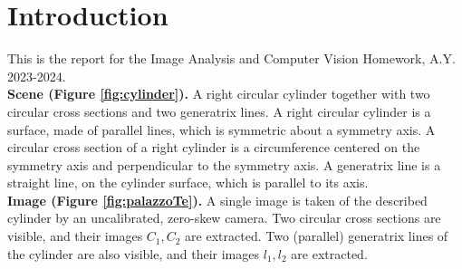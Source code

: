 \documentclass[12pt,a4paper]{article}
\begin{document}
\nocite{bookCV}



\setcounter{section}{-1}

\tableofcontents
\listoffigures

\large

\section{Introduction}
\label{sec:introduction}
This is the report for the Image Analysis and Computer Vision Homework, A.Y. 2023-2024.\\

\textbf{Scene (Figure \ref{fig:cylinder}).} A right circular cylinder together with two circular cross sections and two generatrix lines. A right circular cylinder is a surface, made of parallel lines, which is
symmetric about a symmetry axis. A circular cross section of a right cylinder is a circumference
centered on the symmetry axis and perpendicular to the symmetry axis. A generatrix line is a
straight line, on the cylinder surface, which is parallel to its axis.\\

\textbf{Image (Figure \ref{fig:palazzoTe}).} A single image is taken of the described cylinder by an uncalibrated, zero-skew camera. Two circular cross sections are visible, and their images $C_1,C_2$ are extracted. Two (parallel) generatrix lines of the cylinder are also visible, and their images $l_1,l_2$ are extracted.
\end{document}
